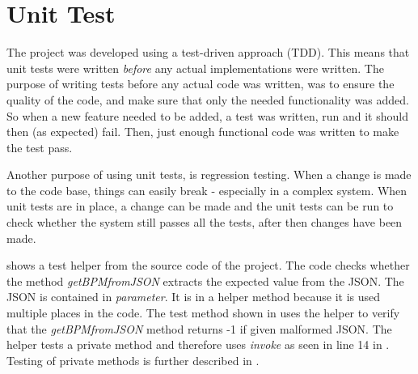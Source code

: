 \section{Unit Test}

The project was developed using a test-driven approach (TDD). This means that unit tests were written \textit{before} any actual implementations were written. The purpose of writing tests before any actual code was written, was to ensure the quality of the code, and make sure that only the needed functionality was added. So when a new feature needed to be added, a test was written, run and it should then (as expected) fail. Then, just enough functional code was written to make the test pass. 

Another purpose of using unit tests, is regression testing. When a change is made to the code base, things can easily break - especially in a complex system. When unit tests are in place, a change can be made and the unit tests can be run to check whether the system still passes all the tests, after then changes have been made. 

 shows a test helper from the source code of the project. The code checks whether the method \textit{getBPMfromJSON} extracts the expected value from the JSON. The JSON is contained in \textit{parameter}. It is in a helper method because it is used multiple places in the code. The test method shown in  uses the helper to verify that the \textit{getBPMfromJSON} method returns -1 if given malformed JSON. The helper tests a private method and therefore uses \textit{invoke} as seen in line 14 in . Testing of private methods is further described in .

